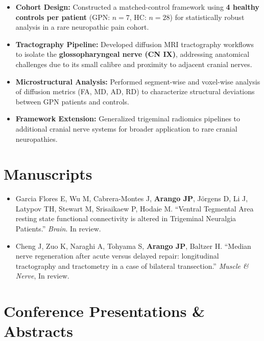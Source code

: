\documentclass[11pt, letterpaper]{article}
\begin{document}
\begin{itemize}[leftmargin=1.5em, topsep=2pt, itemsep=2pt]

    \item \textbf{Cohort Design:} Constructed a matched-control framework using \textbf{4 healthy controls per patient} (GPN: $n=7$, HC: $n=28$) for statistically robust analysis in a rare neuropathic pain cohort.

    \item \textbf{Tractography Pipeline:} Developed diffusion MRI tractography workflows to isolate the \textbf{glossopharyngeal nerve (CN IX)}, addressing anatomical challenges due to its small calibre and proximity to adjacent cranial nerves.

    \item \textbf{Microstructural Analysis:} Performed segment-wise and voxel-wise analysis of diffusion metrics (FA, MD, AD, RD) to characterize structural deviations between GPN patients and controls.

    \item \textbf{Framework Extension:} Generalized trigeminal radiomics pipelines to additional cranial nerve systems for broader application to rare cranial neuropathies.
\end{itemize}

\vspace{4pt}



\section{Manuscripts}

\begin{itemize}[leftmargin=1.5em, topsep=2pt, itemsep=4pt]
    \item Garcia Flores E, Wu M, Cabrera-Montes J, \textbf{Arango JP}, Jörgens D, Li J, Latypov TH, Stewart M, Srisaikaew P, Hodaie M. ``Ventral Tegmental Area resting state functional connectivity is altered in Trigeminal Neuralgia Patients.'' \textit{Brain}. In review.
    \item Cheng J, Zuo K, Naraghi A, Tohyama S, \textbf{Arango JP}, Baltzer H. ``Median nerve regeneration after acute versus delayed repair: longitudinal tractography and tractometry in a case of bilateral transection.'' \textit{Muscle \& Nerve}, In review.
\end{itemize}

\section{Conference Presentations \& Abstracts}
\end{document}
